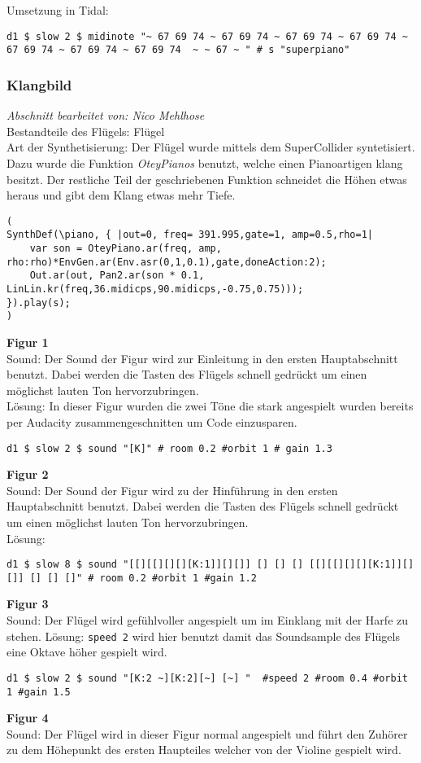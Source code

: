 \documentclass[
10pt, %
a4paper, %
oneside, %
headinclude,footinclude, %
BCOR5mm, %
]{scrartcl}
\begin{document}
\noindent Umsetzung in Tidal:
\begin{lstlisting}
d1 $ slow 2 $ midinote "~ 67 69 74 ~ 67 69 74 ~ 67 69 74 ~ 67 69 74 ~ 67 69 74 ~ 67 69 74 ~ 67 69 74  ~ ~ 67 ~ " # s "superpiano"
\end{lstlisting}


\subsubsection{Klangbild}
\textit{Abschnitt bearbeitet von: Nico Mehlhose}\\

\noindent Bestandteile des Flügels: Flügel\\
Art der Synthetisierung: Der Flügel wurde mittels dem SuperCollider syntetisiert. Dazu wurde die Funktion \textit{OteyPianos} benutzt, welche einen Pianoartigen klang besitzt. Der restliche Teil der geschriebenen Funktion schneidet die Höhen etwas heraus und gibt dem Klang etwas mehr Tiefe. 
\begin{lstlisting}
(
SynthDef(\piano, { |out=0, freq= 391.995,gate=1, amp=0.5,rho=1|
    var son = OteyPiano.ar(freq, amp, rho:rho)*EnvGen.ar(Env.asr(0,1,0.1),gate,doneAction:2);
    Out.ar(out, Pan2.ar(son * 0.1, LinLin.kr(freq,36.midicps,90.midicps,-0.75,0.75)));
}).play(s);
)
\end{lstlisting}
\noindent \textbf{Figur 1}\\
Sound: Der Sound der Figur wird zur Einleitung in den ersten Hauptabschnitt benutzt. Dabei werden die Tasten des Flügels 
schnell gedrückt um einen möglichst lauten Ton hervorzubringen.\\
Lösung: In dieser Figur wurden die zwei Töne die stark angespielt wurden bereits per Audacity zusammengeschnitten um Code einzusparen.
\begin{lstlisting}
d1 $ slow 2 $ sound "[K]" # room 0.2 #orbit 1 # gain 1.3
\end{lstlisting}
\noindent \textbf{Figur 2}\\
Sound: Der Sound der Figur wird zu der Hinführung in den ersten Hauptabschnitt benutzt. Dabei werden die Tasten des Flügels 
schnell gedrückt um einen möglichst lauten Ton hervorzubringen.\\
Lösung:
\begin{lstlisting}
d1 $ slow 8 $ sound "[[][[][][][K:1]][][]] [] [] [] [[][[][][][K:1]][][]] [] [] []" # room 0.2 #orbit 1 #gain 1.2
\end{lstlisting}
\noindent \textbf{Figur 3}\\
Sound: Der Flügel wird gefühlvoller angespielt um im Einklang mit der Harfe zu stehen.
Lösung: \verb|speed 2| wird hier benutzt damit das Soundsample des Flügels eine Oktave höher gespielt wird.
\begin{lstlisting}
d1 $ slow 2 $ sound "[K:2 ~][K:2][~] [~] "  #speed 2 #room 0.4 #orbit 1 #gain 1.5
\end{lstlisting}
\noindent \textbf{Figur 4}\\
Sound: Der Flügel wird in dieser Figur normal angespielt und führt den Zuhörer zu dem Höhepunkt des ersten Haupteiles welcher von der Violine gespielt wird.\\
\end{document}
